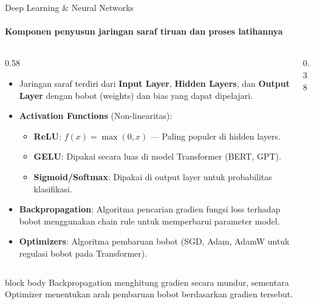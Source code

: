\documentclass[aspectratio=169,t]{beamer}
\newcommand{\takeaway}[1]{%
  \vspace{0.1em}
  \begin{beamercolorbox}[rounded=true,shadow=false,sep=5pt]{block body}
    \centering\footnotesize\color{nvlightgreen}#1
  \end{beamercolorbox}%
}
\begin{document}
\begin{frame}{Deep Learning \& Neural Networks}
  \framesubtitle{Komponen penyusun jaringan saraf tiruan dan proses latihannya}
  \begin{columns}[T]
    \begin{column}{0.58\textwidth}
      \begin{itemize}\footnotesize
        \item Jaringan saraf terdiri dari \textbf{Input Layer}, \textbf{Hidden Layers}, dan \textbf{Output Layer} dengan bobot (weights) dan bias yang dapat dipelajari.
        \item \textbf{Activation Functions} (Non-linearitas):
          \begin{itemize}\scriptsize
            \item \textbf{ReLU}: $f(x) = \max(0, x)$ --- Paling populer di hidden layers.
            \item \textbf{GELU}: Dipakai secara luas di model Transformer (BERT, GPT).
            \item \textbf{Sigmoid/Softmax}: Dipakai di output layer untuk probabilitas klasifikasi.
          \end{itemize}
        \item \textbf{Backpropagation}: Algoritma pencarian gradien fungsi loss terhadap bobot menggunakan chain rule untuk memperbarui parameter model.
        \item \textbf{Optimizers}: Algoritma pembaruan bobot (SGD, Adam, AdamW untuk regulasi bobot pada Transformer).
      \end{itemize}
    \end{column}
    \begin{column}{0.38\textwidth}
      \begin{center}
      \end{center}
    \end{column}
  \end{columns}
  \takeaway{Backpropagation menghitung gradien secara mundur, sementara Optimizer menentukan arah pembaruan bobot berdasarkan gradien tersebut.}
\end{frame}
\end{document}

